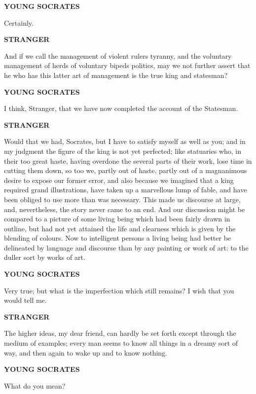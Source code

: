 \documentclass[11pt,letter]{article}
\begin{document}
\par \textbf{YOUNG SOCRATES}
\par   Certainly.

\par \textbf{STRANGER}
\par   And if we call the management of violent rulers tyranny, and the voluntary management of herds of voluntary bipeds politics, may we not further assert that he who has this latter art of management is the true king and statesman?

\par \textbf{YOUNG SOCRATES}
\par   I think, Stranger, that we have now completed the account of the Statesman.

\par \textbf{STRANGER}
\par   Would that we had, Socrates, but I have to satisfy myself as well as you; and in my judgment the figure of the king is not yet perfected; like statuaries who, in their too great haste, having overdone the several parts of their work, lose time in cutting them down, so too we, partly out of haste, partly out of a magnanimous desire to expose our former error, and also because we imagined that a king required grand illustrations, have taken up a marvellous lump of fable, and have been obliged to use more than was necessary. This made us discourse at large, and, nevertheless, the story never came to an end. And our discussion might be compared to a picture of some living being which had been fairly drawn in outline, but had not yet attained the life and clearness which is given by the blending of colours. Now to intelligent persons a living being had better be delineated by language and discourse than by any painting or work of art:  to the duller sort by works of art.

\par \textbf{YOUNG SOCRATES}
\par   Very true; but what is the imperfection which still remains? I wish that you would tell me.

\par \textbf{STRANGER}
\par   The higher ideas, my dear friend, can hardly be set forth except through the medium of examples; every man seems to know all things in a dreamy sort of way, and then again to wake up and to know nothing.

\par \textbf{YOUNG SOCRATES}
\par   What do you mean?
\end{document}
